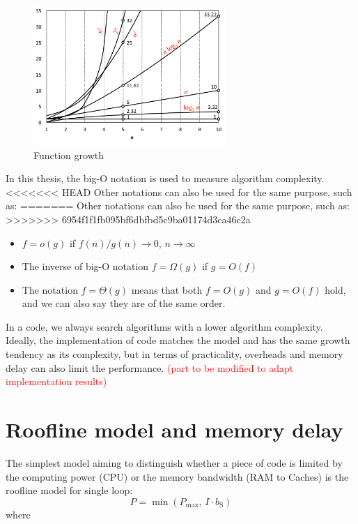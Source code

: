 \begin{figure}[h]
\begin{centering}
\includegraphics[width=0.65\textwidth]{_figure/orders-of-growth}
\par\end{centering}

\caption{Function growth\label{fig:order-of-growth}}
\end{figure}


In this thesis, the big-O notation is used to measure algorithm complexity.
<<<<<<< HEAD
Other notations can also be used for the same purpose, such as:
=======
Other notations can also be used for the same purpose, such as: 
>>>>>>> 6954f1f1fb095bf6dbfbd5c9ba01174d3ca46c2a
\begin{itemize}
\item $f=o(g)$ if $f(n)/g(n)\rightarrow0$, $n\rightarrow\infty$
\item The inverse of big-O notation $f=\Omega(g)$ if $g=O(f)$
\item The notation $f=\Theta(g)$ means that both $f=O(g)$ and $g=O(f)$
hold, and we can also say they are of the same order.
\end{itemize}
In a code, we always search algorithms with a lower algorithm complexity.
Ideally, the implementation of code matches the model and has the
same growth tendency as its complexity, but in terms of practicality,
overheads and memory delay can also limit the performance. \textcolor{red}{(part
to be modified to adapt implementation results)}


\section{Roofline model and memory delay}

The simplest model aiming to distinguish whether a piece of code is
limited by the computing power (CPU) or the memory bandwidth (RAM
to Caches) is the roofline model \citep{Williams_2009_roofline} for
single loop:
\begin{equation}
P=\min\left(P_{\max},\,I\cdot b_{\mathrm{S}}\right)\label{eq:roofline}
\end{equation}
where

